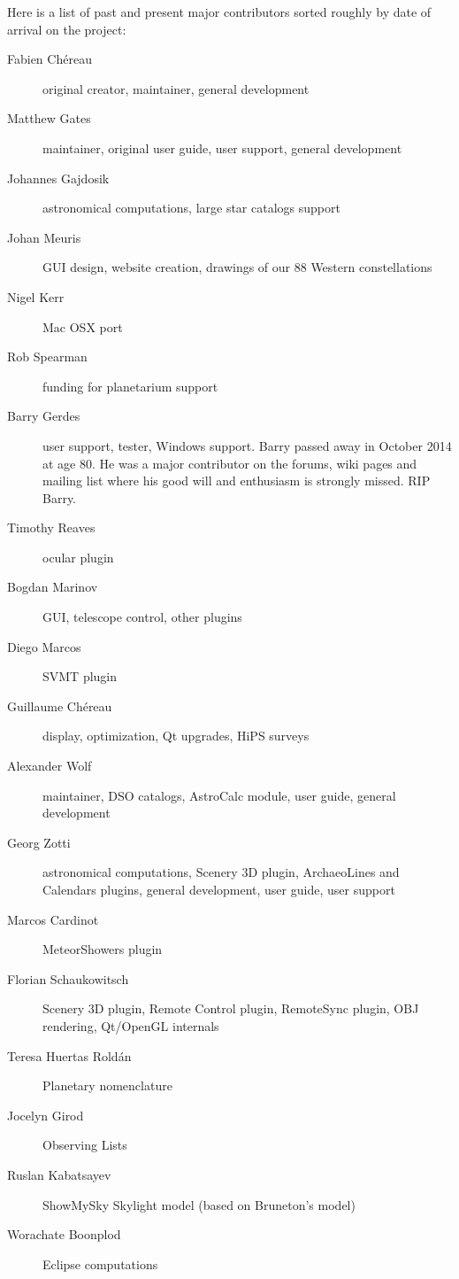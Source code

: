 Here is a list of past and present major contributors sorted roughly by date of
arrival on the project:
\newpage
\begin{description}
\item[Fabien Ch\'ereau] original creator, maintainer, general development
\item[Matthew Gates] maintainer, original user guide, user support, general development
\item[Johannes Gajdosik] astronomical computations, large star catalogs support
\item[Johan Meuris] GUI design, website creation, drawings of our 88 Western constellations
\item[Nigel Kerr] Mac OSX port
\item[Rob Spearman] funding for planetarium support
\item[Barry Gerdes] user support, tester, Windows support. Barry
  passed away in October 2014 at age 80. He was a major contributor on
  the forums, wiki pages and mailing list where his good will and
  enthusiasm is strongly missed.  RIP Barry.
\item[Timothy Reaves] ocular plugin
\item[Bogdan Marinov] GUI, telescope control, other plugins
\item[Diego Marcos] SVMT plugin
\item[Guillaume Ch\'ereau] display, optimization, Qt upgrades, HiPS surveys
\item[Alexander Wolf] maintainer, DSO catalogs, AstroCalc module, user guide, general development
\item[Georg Zotti] astronomical computations, Scenery 3D plugin, ArchaeoLines and Calendars plugins, general development, user guide, user support
\item[Marcos Cardinot] MeteorShowers plugin
\item[Florian Schaukowitsch] Scenery 3D plugin, Remote Control plugin, RemoteSync plugin, OBJ rendering, Qt/OpenGL internals
\item[Teresa Huertas Rold\'an] Planetary nomenclature
\item[Jocelyn Girod] Observing Lists
\item[Ruslan Kabatsayev] ShowMySky Skylight model (based on Bruneton's model) 
\item[Worachate Boonplod] Eclipse computations
\end{description}

